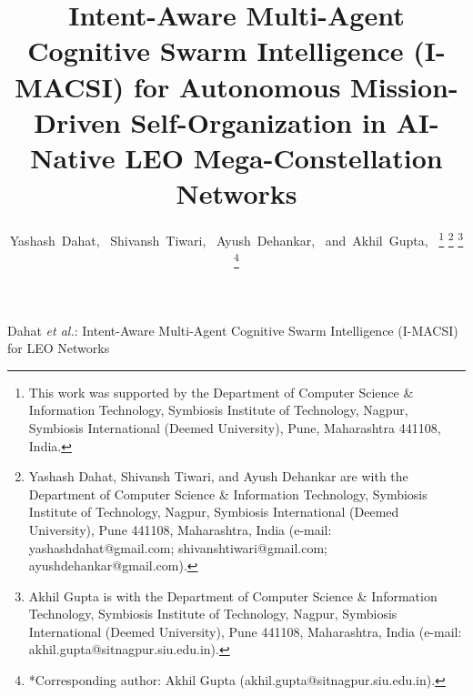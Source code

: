 \documentclass[journal]{IEEEtran}
\begin{document}
\title{Intent-Aware Multi-Agent Cognitive Swarm Intelligence (I-MACSI) for Autonomous Mission-Driven Self-Organization in AI-Native LEO Mega-Constellation Networks}

\author{Yashash~Dahat,~
        Shivansh~Tiwari,~
        Ayush~Dehankar,~
        and~Akhil~Gupta,~%
\thanks{This work was supported by the Department of Computer Science \& Information Technology, Symbiosis Institute of Technology, Nagpur, Symbiosis International (Deemed University), Pune, Maharashtra 441108, India.}%
\thanks{Yashash Dahat, Shivansh Tiwari, and Ayush Dehankar are with the Department of Computer Science \& Information Technology, Symbiosis Institute of Technology, Nagpur, Symbiosis International (Deemed University), Pune 441108, Maharashtra, India (e-mail: yashashdahat@gmail.com; shivanshtiwari@gmail.com; ayushdehankar@gmail.com).}%
\thanks{Akhil Gupta is with the Department of Computer Science \& Information Technology, Symbiosis Institute of Technology, Nagpur, Symbiosis International (Deemed University), Pune 441108, Maharashtra, India (e-mail: akhil.gupta@sitnagpur.siu.edu.in).}%
\thanks{*Corresponding author: Akhil Gupta (akhil.gupta@sitnagpur.siu.edu.in).}}

%
{Dahat \MakeLowercase{\textit{et al.}}: Intent-Aware Multi-Agent Cognitive Swarm Intelligence (I-MACSI) for LEO Networks}

\maketitle
\end{document}
